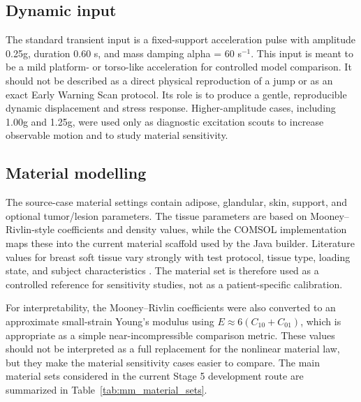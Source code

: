 \subsection{Dynamic input}

The standard transient input is a fixed-support acceleration pulse with amplitude 0.25g, duration 0.60 s, and mass damping alpha = 60 s$^{-1}$. This input is meant to be a mild platform- or torso-like acceleration for controlled model comparison. It should not be described as a direct physical reproduction of a jump or as an exact Early Warning Scan protocol. Its role is to produce a gentle, reproducible dynamic displacement and stress response. Higher-amplitude cases, including 1.00g and 1.25g, were used only as diagnostic excitation scouts to increase observable motion and to study material sensitivity.

\subsection{Material modelling}

The source-case material settings contain adipose, glandular, skin, support, and optional tumor/lesion parameters. The tissue parameters are based on Mooney--Rivlin-style coefficients and density values, while the COMSOL implementation maps these into the current material scaffold used by the Java builder. Literature values for breast soft tissue vary strongly with test protocol, tissue type, loading state, and subject characteristics \cite{Samani2007,Ramiao2016,Teixeira2023,Chen2025}. The material set is therefore used as a controlled reference for sensitivity studies, not as a patient-specific calibration.

For interpretability, the Mooney--Rivlin coefficients were also converted to an approximate small-strain Young's modulus using \(E \approx 6(C_{10}+C_{01})\), which is appropriate as a simple near-incompressible comparison metric. These values should not be interpreted as a full replacement for the nonlinear material law, but they make the material sensitivity cases easier to compare. The main material sets considered in the current Stage 5 development route are summarized in Table~\ref{tab:mm_material_sets}.

